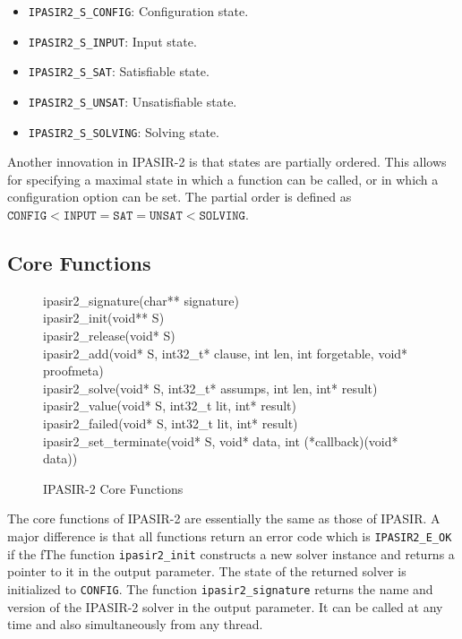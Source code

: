\documentclass[sat]{iosart2x}
\begin{document}
\begin{itemize}
    \item \texttt{IPASIR2\_S\_CONFIG}: Configuration state.
    \item \texttt{IPASIR2\_S\_INPUT}: Input state.
    \item \texttt{IPASIR2\_S\_SAT}: Satisfiable state.
    \item \texttt{IPASIR2\_S\_UNSAT}: Unsatisfiable state.
    \item \texttt{IPASIR2\_S\_SOLVING}: Solving state.
\end{itemize}

Another innovation in IPASIR-2 is that states are partially ordered.
This allows for specifying a maximal state in which a function can be called, or in which a configuration option can be set.
The partial order is defined as $\mathtt{CONFIG < INPUT = SAT = UNSAT < SOLVING}$.

\subsection{Core Functions}

\begin{figure}[t]
    \tt\raggedright
    ipasir2\_signature(char** signature)\\[1ex]
    ipasir2\_init(void** S)\\
    ipasir2\_release(void* S)\\[1ex]
    ipasir2\_add(void* S, int32\_t* clause, int len, int forgetable, void* proofmeta)\\
    ipasir2\_solve(void* S, int32\_t* assumps, int len, int* result)\\
    ipasir2\_value(void* S, int32\_t lit, int* result)\\
    ipasir2\_failed(void* S, int32\_t lit, int* result)\\[1ex]
    ipasir2\_set\_terminate(void* S, void* data, int (*callback)(void* data))
    \caption{IPASIR-2 Core Functions}
\end{figure}

The core functions of IPASIR-2 are essentially the same as those of IPASIR.
A major difference is that all functions return an error code which is \texttt{IPASIR2\_E\_OK} if the fThe function \texttt{ipasir2\_init} constructs a new solver instance and returns a pointer to it in the output parameter.
The state of the returned solver is initialized to \texttt{CONFIG}.
The function \texttt{ipasir2\_signature} returns the name and version of the IPASIR-2 solver in the output parameter.
It can be called at any time and also simultaneously from any thread.
\end{document}

